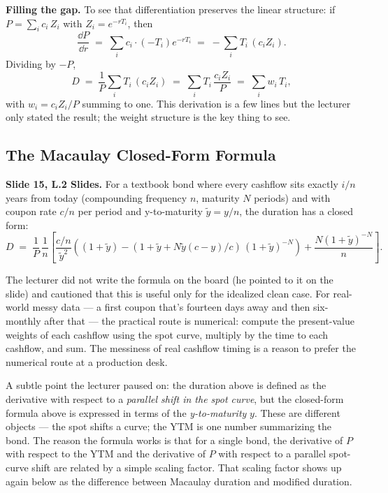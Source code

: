 \begin{tipblock}
\textbf{Filling the gap.} To see that differentiation preserves the linear
structure: if $P = \sum_i c_i\,Z_i$ with $Z_i = e^{-rT_i}$, then
\[
  \frac{\dd P}{\dd r} \;=\; \sum_i c_i \cdot (-T_i) e^{-rT_i}
                 \;=\; -\sum_i T_i\,(c_i Z_i).
\]
Dividing by $-P$,
\[
  D \;=\; \frac{1}{P}\sum_i T_i\,(c_i Z_i)
        \;=\; \sum_i T_i\,\frac{c_i Z_i}{P}
        \;=\; \sum_i w_i\,T_i,
\]
with $w_i = c_i Z_i/P$ summing to one. This derivation is a few lines but
the lecturer only stated the result; the weight structure is the key thing
to see.
\end{tipblock}

\subsection{The Macaulay Closed-Form Formula}\label{L2-sec:duration-macaulay}

\textbf{Slide 15, L.2 Slides.} For a textbook bond where every cashflow sits
exactly $i/n$ years from today (compounding frequency $n$, maturity $N$
periods) and with coupon rate $c/n$ per period and y-to-maturity
$\tilde{y} = y/n$, the duration has a closed form:
\[
  D \;=\; \frac{1}{P}\,\frac{1}{n}\left[
            \frac{c/n}{\tilde{y}^2}\left(
              (1+\tilde{y}) - (1 + \tilde{y} + N\tilde{y}(c - y)/c)\,(1+\tilde{y})^{-N}
            \right) + \frac{N(1+\tilde{y})^{-N}}{n}
          \right].
\]

The lecturer did not write the formula on the board (he pointed to it on the
slide) and cautioned that this is useful only for the idealized clean case.
For real-world messy data --- a first coupon that's fourteen days away and then
six-monthly after that --- the practical route is numerical: compute the
present-value weights of each cashflow using the spot curve, multiply by the
time to each cashflow, and sum. The messiness of real cashflow timing is a
reason to prefer the numerical route at a production desk.

A subtle point the lecturer paused on: the duration above is defined as the
derivative with respect to a \emph{parallel shift in the spot curve}, but the
closed-form formula above is expressed in terms of the \emph{y-to-maturity}
$y$. These are different objects --- the spot shifts a curve; the YTM is one
number summarizing the bond. The reason the formula works is that for a
single bond, the derivative of $P$ with respect to the YTM and the derivative
of $P$ with respect to a parallel spot-curve shift are related by a simple
scaling factor. That scaling factor shows up again below as the difference
between Macaulay duration and modified duration.

